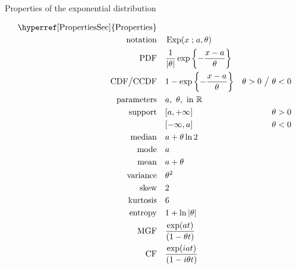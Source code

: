 

\begin{table*}[t!]
\caption[Exponential distribution -- Properties]{Properties of the exponential distribution}
\begin{align*}
\text{\hyperref[PropertiesSec]{Properties}}  \quad& \\
\text{notation} \quad & \op{Exp}(x\given a,\theta)					\checked
\\
\text{PDF}\quad &    \frac{1}{|\theta|} \exp\left\{-\frac{x-a}{\theta}\right\} 	\checked
\\
\text{CDF}\big  / \text{CCDF}  \quad  &   1- \exp\left\{-\frac{x-a}{\theta}\right\} & \theta>0 \ \big{/} \  \theta<0
\checked
\\
\text{parameters}\quad &   a,\ \theta, \text{ in } \Real 				\checked
\\
\text{support} \quad &   [ a, +\infty]      & \theta>0					\checked
\\
				&   [-\infty,  a]     & \theta <0					\checked
\\
\text{median} \quad  &  a + \theta \ln 2							\checked
\\
\text{mode} \quad  & a										\checked
\\
\text{mean} \quad  &  a+ \theta									\checked						
\\
\text{variance} \quad  & \theta^2								\checked
\\
\text{skew} \quad  &  2										\checked
\\
\text{kurtosis} \quad  &  6										\checked
\\
\text{entropy} \quad  & 1 + \ln |\theta|							\checked
\\
\text{MGF} \quad  & \frac{\exp(at) }{ \left(1- \theta t\right)}				\checked
\\
\text{CF} \quad  & \frac{\exp(iat) }{ \left(1- i \theta t\right)}				\checked
\end{align*}
\end{table*}
